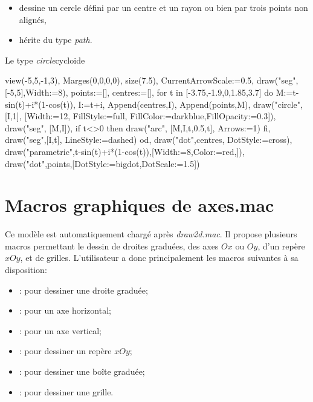 {\centering {}\par}

\begin{itemize}
 \item\desc dessine un cercle défini par un centre et un rayon ou bien par trois points non alignés,
 \item hérite du type \emph{path}.
\end{itemize}

\begin{demo}{Le type \emph{circle}}{cycloide}
\begin{texgraph}[name=cycloide]
view(-5,5,-1,3), Marges(0,0,0,0), size(7.5),
CurrentArrowScale:=0.5, draw("seg",[-5,5],Width:=8),
points:=[], centres:=[],
for t in [-3.75,-1.9,0,1.85,3.7] do
 M:=t-sin(t)+i*(1-cos(t)), I:=t+i,
 Append(centres,I), Append(points,M),
 draw("circle", [I,1], [Width:=12, FillStyle:=full,
  FillColor:=darkblue,FillOpacity:=0.3]),
 draw("seg", [M,I]),
 if t<>0 then
  draw("arc", [M,I,t,0.5,t], Arrows:=1) fi,
  draw("seg",[I,t], LineStyle:=dashed)
od,
draw("dot",centres, DotStyle:=cross),
draw("parametric",t-sin(t)+i*(1-cos(t)),[Width:=8,Color:=red,]),
draw("dot",points,[DotStyle:=bigdot,DotScale:=1.5]) 
\end{texgraph}
\end{demo}

\section{Macros graphiques de axes.mac}\label{modeleAxes}

Ce modèle est automatiquement chargé après \emph{draw2d.mac}. Il propose plusieurs macros permettant le dessin de droites graduées, des axes $Ox$ ou $Oy$, d'un repère $xOy$, et de grilles. L’utilisateur a donc principalement les macros suivantes à sa disposition:

\begin{itemize}
 \item {}: pour dessiner une droite graduée;
 \item {}: pour un axe horizontal;
 \item {}: pour un axe vertical;
 \item {}: pour dessiner un repère $xOy$;
 \item {}: pour dessiner une boîte graduée;
 \item {}: pour dessiner une grille.
\end{itemize}

